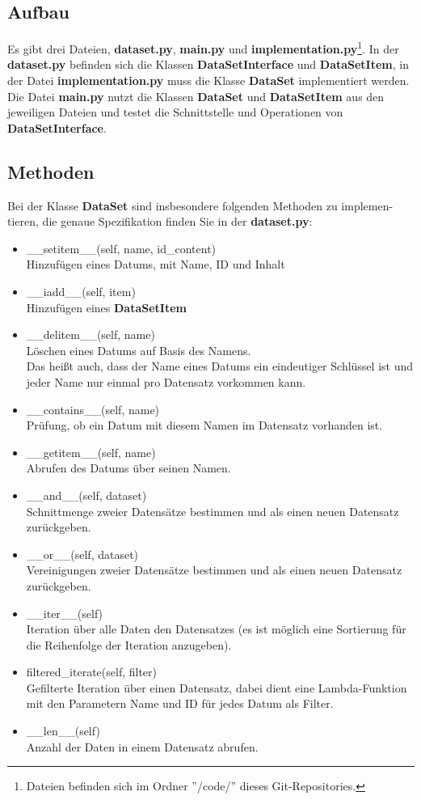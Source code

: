 \documentclass{scrartcl}
\begin{document}
\subsection[Aufbau]{Aufbau}
Es gibt drei Dateien, \textbf{dataset.py}, \textbf{main.py} und \textbf{implementation.py}\footnote[1]{Dateien befinden sich im Ordner ''/code/'' dieses Git-Repositories.}. In der
\textbf{dataset.py} befinden sich die Klassen \textbf{DataSetInterface} und \textbf{DataSetItem},
in der Datei \textbf{implementation.py} muss die Klasse \textbf{DataSet} implementiert
werden. Die Datei \textbf{main.py} nutzt die Klassen \textbf{DataSet} und \textbf{DataSetItem}
aus den jeweiligen Dateien und testet die Schnittstelle und Operationen von
\textbf{DataSetInterface}.
\subsection[Methoden]{Methoden}
Bei der Klasse \textbf{DataSet} sind insbesondere folgenden Methoden zu implemen-
tieren, die genaue Spezifikation finden Sie in der \textbf{dataset.py}:
\begin{itemize}
    \item \_\_setitem\_\_(self, name, id\_content)\\Hinzufügen eines Datums, mit Name, ID und Inhalt
    \item \_\_iadd\_\_(self, item)\\Hinzufügen eines \textbf{DataSetItem}
    \item \_\_delitem\_\_(self, name)\\Löschen eines Datums auf Basis des Namens.\\Das heißt auch, dass der Name eines Datums ein eindeutiger Schlüssel ist und jeder Name nur einmal pro Datensatz vorkommen kann.
    \item \_\_contains\_\_(self, name)\\Prüfung, ob ein Datum mit diesem Namen im Datensatz vorhanden ist.
    \item \_\_getitem\_\_(self, name)\\Abrufen des Datums über seinen Namen.
    \item \_\_and\_\_(self, dataset)\\Schnittmenge zweier Datensätze bestimmen und als einen neuen Datensatz zurückgeben.
    \item \_\_or\_\_(self, dataset)\\Vereinigungen zweier Datensätze bestimmen und als einen neuen Datensatz zurückgeben.
    \item \_\_iter\_\_(self)\\Iteration über alle Daten den Datensatzes (es ist möglich eine Sortierung für die Reihenfolge der Iteration anzugeben).
    \item filtered\_iterate(self, filter)\\Gefilterte Iteration über einen Datensatz, dabei dient eine Lambda-Funktion mit den Parametern Name und ID für jedes Datum als Filter.
    \item \_\_len\_\_(self)\\Anzahl der Daten in einem Datensatz abrufen.

\end{itemize}
\end{document}
